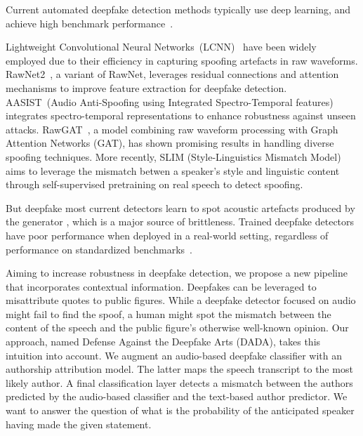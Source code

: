 \documentclass{Interspeech}
\begin{document}

Current automated deepfake detection methods typically use deep learning, and
achieve high benchmark performance~\cite{ASVspoof_21,zeng2023deepfake}.

Lightweight Convolutional Neural Networks~(LCNN)~\cite{lfcc_lcnn} have been
widely employed due to their efficiency in capturing spoofing artefacts in raw
waveforms. RawNet2~\cite{rawnet2}, a variant of RawNet, leverages residual
connections and attention mechanisms to improve feature extraction for deepfake
detection. AASIST~(Audio Anti-Spoofing using Integrated Spectro-Temporal
features)~\cite{aasist} integrates spectro-temporal representations to enhance
robustness against unseen attacks. RawGAT~\cite{rawgat}, a model combining raw
waveform processing with Graph Attention Networks (GAT), has shown promising
results in handling diverse spoofing techniques. More recently, SLIM
(Style-Linguistics Mismatch Model)~\cite{slim} aims to leverage the mismatch
betwen a speaker's style and linguistic content through self-supervised
pretraining on real speech to detect spoofing.

But deepfake most current detectors learn to spot acoustic artefacts produced
by the generator , which is a major source of
brittleness. Trained deepfake detectors have poor performance when deployed in
a real-world setting, regardless of performance on standardized
benchmarks~\cite{in_the_wild}.

Aiming to increase robustness in deepfake detection, we propose a new pipeline
that incorporates contextual information. Deepfakes can be leveraged to
misattribute quotes to public figures. While a deepfake detector focused on
audio might fail to find the spoof, a human might spot the mismatch between the
content of the speech and the public figure's otherwise well-known opinion. Our
approach, named Defense Against the Deepfake Arts (DADA), takes this intuition
into account. We augment an audio-based deepfake classifier with an authorship
attribution model. The latter maps the speech transcript to the most likely
author. A final classification layer detects a mismatch between the authors
predicted by the audio-based classifier and the text-based author predictor. We
want to answer the question of what is the probability of the anticipated
speaker having made the given statement.
\end{document}
